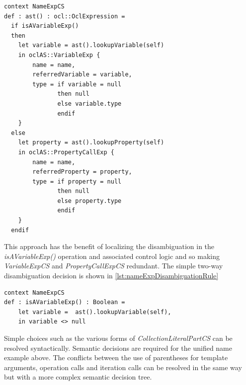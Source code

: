 \documentclass{llncs}
\begin{document}
\begin{lstlisting}[caption=CS2AS description for an ambiguous name expression, label=lst:nameExpDisambiguation, language=OCL]
context NameExpCS
def : ast() : ocl::OclExpression =
  if isAVariableExp() 
  then
    let variable = ast().lookupVariable(self)
    in oclAS::VariableExp {
        name = name,
        referredVariable = variable,
        type = if variable = null
               then null
               else variable.type
               endif
    }
  else 
    let property = ast().lookupProperty(self)
    in oclAS::PropertyCallExp {
        name = name,
        referredProperty = property,
        type = if property = null
               then null
               else property.type
               endif
    }
  endif	
\end{lstlisting}

This approach has the benefit of localizing the disambiguation in the \emph{isAVariableExp()} operation and associated control logic and so making \emph{VariableExpCS} and \emph{PropertyCallExpCS} redundant. The simple two-way disambiguation decision is shown in \ref{lst:nameExpDisambiguationRule}

\begin{lstlisting}[caption=NameExpCS disambigutation rule, label=lst:nameExpDisambiguationRule, language=OCL]
context NameExpCS
def : isAVariableExp() : Boolean =
	let variable =  ast().lookupVariable(self),
	in variable <> null
\end{lstlisting}

Simple choices such as the various forms of \emph{CollectionLiteralPartCS} can be resolved syntactically. Semantic decisions are required for the unified name example above. The conflicts between the use of parentheses for template arguments, operation calls and iteration calls can be resolved in the same way but with a more complex semantic decision tree.

\end{document}
